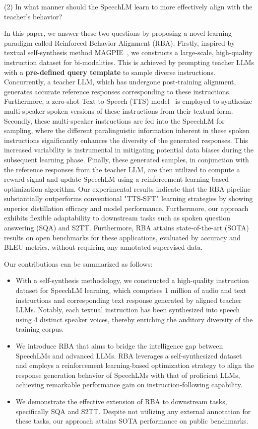 \documentclass[letterpaper]{article} %
\begin{document}
(2) In what manner should the SpeechLM learn to more effectively align with the teacher's behavior? \par
In this paper, we answer these two questions by proposing a novel learning paradigm called Reinforced Behavior Alignment (RBA). Firstly, inspired by textual self-synthesis method MAGPIE~\cite{xu2024magpie}, we constructs a large-scale, high-quality instruction dataset for bi-modalities. This is achieved by prompting teacher LLMs with a \textbf{pre-defined query template} to sample diverse instructions. Concurrently, a teacher LLM, which has undergone post-training alignment, generates accurate reference responses corresponding to these instructions. Furthermore, a zero-shot Text-to-Speech (TTS) model~\cite{du2024cosyvoice} is employed to synthesize multi-speaker spoken versions of these instructions from their textual form. Secondly, these multi-speaker instructions are fed into the SpeechLM for sampling, where the different paralinguistic information inherent in these spoken instructions significantly enhances the diversity of the generated responses. This increased variability is instrumental in mitigating potential data biases during the subsequent learning phase. Finally, these generated samples, in conjunction with the reference responses from the teacher LLM, are then utilized to compute a reward signal and update SpeechLM using a reinforcement learning-based optimization algorithm. Our experimental results indicate that the RBA pipeline substantially outperforms conventional "TTS-SFT" learning strategies by showing superior distillation efficacy and model performance. Furthermore, our approach exhibits flexible adaptability to downstream tasks such as spoken question answering (SQA) and S2TT. Furthermore, RBA attains state-of-the-art (SOTA) results on open benchmarks for these applications, evaluated by accuracy and BLEU metrics, without requiring any annotated supervised data. \par
Our contributions can be summarized as follows:
\begin{itemize}
    \item With a self-synthesis methodology, we constructed a high-quality instruction dataset for SpeechLM learning, which comprises 1 million of audio and text instructions and corresponding text response generated by aligned teacher LLMs. Notably, each textual instruction has been synthesized into speech using 4 distinct speaker voices, thereby enriching the auditory diversity of the training corpus.
    \item We introduce RBA that aims to bridge the intelligence gap between SpeechLMs and advanced LLMs. RBA leverages a self-synthesized dataset and employs a reinforcement learning-based optimization strategy to align the response generation behavior of SpeechLMs with that of proficient LLMs, achieving remarkable performance gain on instruction-following capability.
    \item We demonstrate the effective extension of RBA to downstream tasks, specifically SQA and S2TT. Despite not utilizing any external annotation for these tasks, our approach attains SOTA performance on public benchmarks.
\end{itemize}
\end{document}
